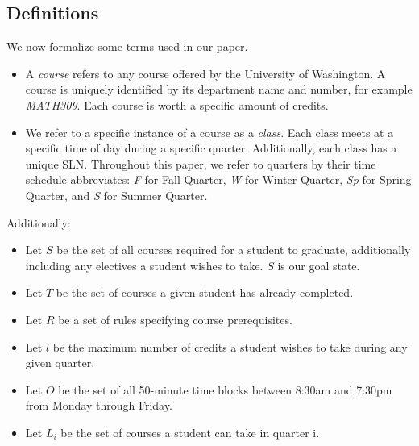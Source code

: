 \documentclass[11pt]{article} %
\begin{document}
\subsection{Definitions} We now formalize some terms used in our paper.
\begin{itemize} \item A {\it course} refers to any course offered by the
University of Washington. A course is uniquely identified by its department name and
number, for example {\it MATH309}. Each course is worth a specific amount
of credits. \item We refer to a specific instance of a course as a {\it class}.
Each class meets at a specific time of day during a specific quarter. Additionally,
each class has a unique SLN. Throughout
this paper, we refer to quarters by their time schedule abbreviates: {\it
F} for Fall Quarter, {\it W} for Winter Quarter, {\it Sp} for Spring Quarter,
and {\it S} for Summer Quarter. \end{itemize}

Additionally: \begin{itemize} \item Let $S$ be the set of all courses required for
a student to graduate, additionally including any electives a student wishes to take.
$S$ is our goal state.  \item Let $T$ be the set of courses
a given student has already completed.
\item Let $R$ be a set of rules specifying course prerequisites.
\item Let $l$ be the maximum number of credits a student wishes to take during
any given quarter.  \item Let $O$ be the set of all 50-minute time blocks
between 8:30am and 7:30pm from Monday through Friday. \item Let $L_i$ be the set
of courses a student can take in quarter i. \end{itemize}
\end{document}
